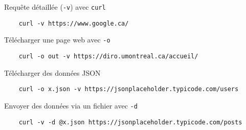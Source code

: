 \documentclass[a4paper]{report}
\begin{document}
    \begin{EExample}{Requête détaillée (\texttt{-v}) avec \texttt{curl}}{}
        \begin{lstlisting}
    curl -v https://www.google.ca/
        \end{lstlisting}
        \begin{center}
            \hyperlink{Requête détaillée avec curl}{
            }
        \end{center}
    \end{EExample}

    \begin{EExample}{Télécharger une page web avec \texttt{-o}}{}
        \begin{lstlisting}
    curl -o out -v https://diro.umontreal.ca/accueil/
        \end{lstlisting}
        \begin{center}
            \hyperlink{Télécharger une page web avec curl}{
            }
        \end{center}
    \end{EExample}

    \begin{EExample}{Télécharger des données JSON}{} 
        \begin{lstlisting}
    curl -o x.json -v https://jsonplaceholder.typicode.com/users
        \end{lstlisting}
        \begin{center}
            \hyperlink{Télécharger des données JSON}{
            }
        \end{center}
    \end{EExample}

    \begin{EExample}{Envoyer des données via un fichier avec \texttt{-d}}{}
        \begin{lstlisting}
    curl -v -d @x.json https://jsonplaceholder.typicode.com/posts
        \end{lstlisting}
        \begin{center}
            \hyperlink{Envoyer des données via un fichier avec curl}{
            }
        \end{center}
    \end{EExample}
\end{document}
